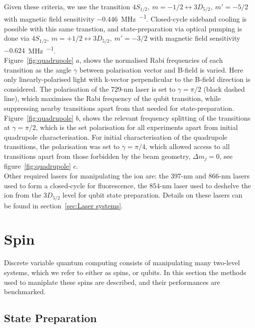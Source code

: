     Given these criteria, we use the transition $4S_{1/2},~m = -1/2 \leftrightarrow 3D_{5/2},~m' = -5/2$ with magnetic field sensitivity 
    $-0.446$~\unit{\MHz\per\gauss}. Closed-cycle sideband cooling is possible with this same transtion, and state-preparation via optical pumping is done via $4S_{1/2},~m = +1/2 \leftrightarrow 3D_{5/2},~m' = -3/2$ with magnetic field sensitivity $-0.624$~\unit{\MHz\per\gauss}. \\
    Figure~\ref{fig:quadrupole} $a$, shows the normalised Rabi frequencies of each transition as the angle $\gamma$ between polarisation vector and B-field is varied. Here only linearly-polarised light with k-vector perpendicular to the B-field direction is considered.
    The polarisation of the 729-nm laser is set to $\gamma = \pi/2$ (black dashed line), which maximises the Rabi frequency of the qubit transition, while suppressing nearby transitions apart from that needed for state-preparation. 
    Figure~\ref{fig:quadrupole} $b$, shows the relevant frequency splitting of the transitions at $\gamma = \pi/2$, which is the set polarisation for all experiments apart from initial quadrupole characterisation.
    For initial characterisation of the quadrupole transitions, the polarisation was set to $\gamma = \pi/4$, which allowed access to all transitions apart from those forbidden by the beam geometry, $\Delta m_j = 0$, see figure~\ref{fig:quadrupole} $c$. \\
    Other required lasers for manipulating the ion are: the 397-nm and 866-nm lasers used to form a closed-cycle for fluorescence, the 854-nm laser used to deshelve the ion from the $3D_{5/2}$ level for qubit state preparation. Details on these lasers can be found in section~\ref{sec:Laser systems}.
    

\section{Spin}
\label{sec:Spin}
    Discrete variable quantum computing consists of manipulating many two-level
    systems, which we refer to either as spins, or qubits. In this section 
    the methods used to maniplate these spins are described, and their
    performances are benchmarked.\\

\subsection{State Preparation}
\label{sec:Stateprep}

